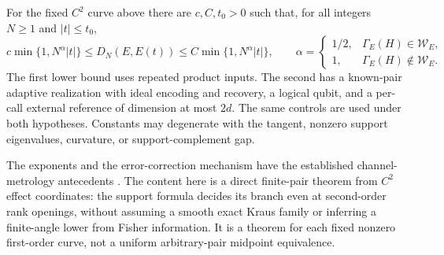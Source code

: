 \begin{theorem}\label{thm:curveclassification85}
For the fixed $C^2$ curve above there are $c,C,t_0>0$ such that,
for all integers $N\ge1$ and $|t|\le t_0$,
\begin{equation}\label{eq:curvedichotomy85}
 c\min\{1,N^\alpha|t|\}\le D_N(E,E(t))
       \le C\min\{1,N^\alpha|t|\},\qquad
 \alpha=
 \begin{cases}
  1/2,&\Gamma_E(H)\in\mathcal W_E,\\
  1,&\Gamma_E(H)\notin\mathcal W_E.
 \end{cases}
\end{equation}
The first lower bound uses repeated product inputs.  The second has a
known-pair adaptive realization with ideal encoding and recovery,
a logical qubit, and a per-call external reference of dimension at
most $2d$.  The same controls are used under both hypotheses.
Constants may degenerate with the tangent, nonzero support eigenvalues,
curvature, or support-complement gap.
\end{theorem}

The exponents and the error-correction mechanism have the established
channel-metrology antecedents \cite{ZJ84,KL84}.  The content here is a
direct finite-pair theorem from $C^2$ effect coordinates: the support
formula decides its branch even at second-order rank openings, without
assuming a smooth exact Kraus family or inferring a finite-angle lower
from Fisher information.  It is a theorem for each fixed nonzero
first-order curve, not a uniform arbitrary-pair midpoint equivalence.

